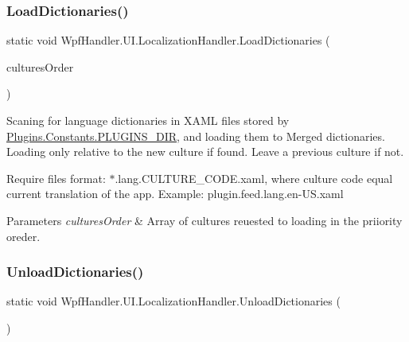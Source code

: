 \subsubsection{\texorpdfstring{Load\+Dictionaries()}{LoadDictionaries()}}
{\footnotesize\ttfamily static void Wpf\+Handler.\+U\+I.\+Localization\+Handler.\+Load\+Dictionaries (\begin{DoxyParamCaption}\item[{params Culture\+Info \mbox{[}$\,$\mbox{]}}]{cultures\+Order }\end{DoxyParamCaption})\hspace{0.3cm}{\ttfamily [static]}}



Scaning for language dictionaries in X\+A\+ML files stored by \mbox{\hyperlink{class_wpf_handler_1_1_plugins_1_1_constants_a96f55ef86fe92a534722f4788340f390}{Plugins.\+Constants.\+P\+L\+U\+G\+I\+N\+S\+\_\+\+D\+IR}}, and loading them to Merged dictionaries. Loading only relative to the new culture if found. Leave a previous culture if not. 

Require files format\+: $\ast$.lang.\+C\+U\+L\+T\+U\+R\+E\+\_\+\+C\+O\+D\+E.\+xaml, where culture code equal current translation of the app. Example\+: plugin.\+feed.\+lang.\+en-\/\+U\+S.\+xaml 


\begin{DoxyParams}{Parameters}
{\em cultures\+Order} & Array of cultures reuested to loading in the priiority oreder.\\
\hline
\end{DoxyParams}
\mbox{\label{class_wpf_handler_1_1_u_i_1_1_localization_handler_a5703a690547759b592d63b5f5b2f489e}} 
\subsubsection{\texorpdfstring{Unload\+Dictionaries()}{UnloadDictionaries()}}
{\footnotesize\ttfamily static void Wpf\+Handler.\+U\+I.\+Localization\+Handler.\+Unload\+Dictionaries (\begin{DoxyParamCaption}{ }\end{DoxyParamCaption})\hspace{0.3cm}{\ttfamily [static]}}



